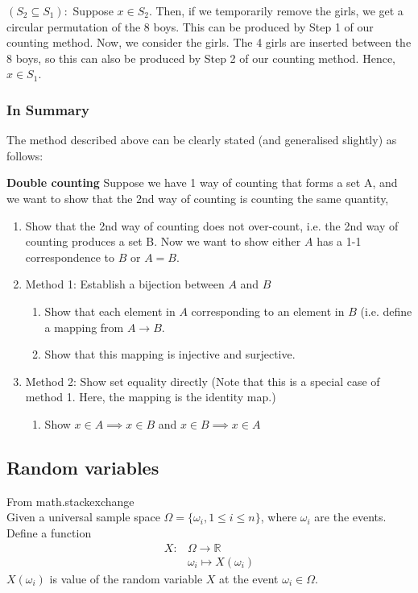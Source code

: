 \documentclass{article}
\begin{document}
$(S_2\subseteq S_1):$
Suppose $x\in S_2$. Then, if we temporarily remove the girls, we get a circular permutation of the 8 boys. This can be produced by Step 1 of our counting method. Now, we consider the girls. The 4 girls are inserted between the 8 boys, so this can also be produced by Step 2 of our counting method. Hence, $x\in S_1$.

\subsubsection{In Summary}
The method described above can be clearly stated (and generalised slightly) as follows:

\textbf{Double counting}
Suppose we have 1 way of counting that forms a set A, and we want to show that the 2nd way of counting is counting the same quantity, 
\begin{enumerate} 
    \item Show that the 2nd way of counting does not over-count, i.e. the 2nd way of counting produces a set B. Now we want to show either $A$ has a 1-1 correspondence to $B$ or $A=B$.
    \item Method 1: Establish a bijection between $A$ and $B$
    \begin{enumerate}
        \item Show that each element in $A$ corresponding to an element in $B$ (i.e. define a mapping from $A\rightarrow B$.
        \item Show that this mapping is injective and surjective.
    \end{enumerate}
    \item Method 2: Show set equality directly (Note that this is a special case of method 1. Here, the mapping is the identity map.)
    \begin{enumerate}
        \item Show $x\in A\implies x\in B$ and $x\in B\implies x\in A$
    \end{enumerate}
\end{enumerate}

\subsection{Random variables}
From math.stackexchange\\
Given a universal sample space $\Omega=\{\omega_i, 1\leq i\leq n\}$, where $\omega_i$ are the events.\\
Define a function
\begin{align*}
	X: &\Omega \rightarrow \mathbb{R}\\
	&\omega_i \mapsto X(\omega_i)
\end{align*}
$X(\omega_i)$ is value of the random variable $X$ at the event $\omega_i \in \Omega$.
\end{document}
